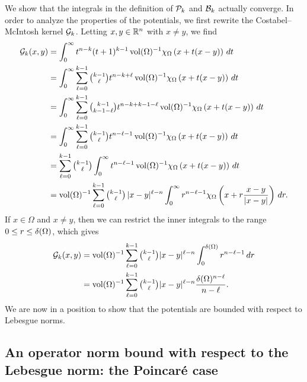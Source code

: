 \documentclass[10pt,a4paper]{article}
\begin{document}
We show that the integrals in the definition of ${\mathcal P}_{k}$ and ${\mathcal B}_{k}$ actually converge. 
In order to analyze the properties of the potentials,
we first rewrite the Costabel--McIntosh kernel ${\mathcal G}_{k}$.
Letting $x,y \in {\mathbb R}^n$ with $x \neq y$, we find 
\begin{align*}
    {\mathcal G}_{k}(x,y) 
    &= 
    \int_{0}^{\infty} t^{n-k} (t+1)^{k-1} \operatorname{vol}(\Omega)^{-1} \chi_{\Omega} \left( x+t(x-y) \right)\,dt
    \\
    &= 
    \int_{0}^{\infty} \sum_{\ell=0}^{k-1} \tbinom{k-1}{\ell} t^{n-k+\ell} \operatorname{vol}(\Omega)^{-1} \chi_{\Omega} \left( x+t(x-y) \right)\,dt
    \\
    &= 
    \int_{0}^{\infty} \sum_{\ell=0}^{k-1} \tbinom{k-1}{k-1-\ell} t^{n-k+k-1-\ell} \operatorname{vol}(\Omega)^{-1} \chi_{\Omega} \left( x+t(x-y) \right)\,dt
    \\
    &= 
    \int_{0}^{\infty} \sum_{\ell=0}^{k-1} \tbinom{k-1}{\ell} t^{n-\ell-1} \operatorname{vol}(\Omega)^{-1} \chi_{\Omega} \left( x+t(x-y) \right)\,dt
    \\
    &= 
    \sum_{\ell=0}^{k-1} \tbinom{k-1}{\ell} \int_{0}^{\infty} t^{n-\ell-1} \operatorname{vol}(\Omega)^{-1} \chi_{\Omega}\left( x+t(x-y) \right)\,dt 
    \\
    &= 
    \operatorname{vol}(\Omega)^{-1} \sum_{\ell=0}^{k-1} \tbinom{k-1}{\ell} \, |x-y|^{\ell-n} \int_{0}^{\infty} r^{n-\ell-1} \chi_{\Omega}\left(x+r\frac{x-y}{|x-y|}\right)\,dr
    .
\end{align*}
If $x \in \Omega$ and $x \neq y$, 
then we can restrict the inner integrals to the range $0 \leq r \leq {\delta}(\Omega)$, which gives 
\begin{align*}
    {\mathcal G}_{k}(x,y) 
    &= 
    \operatorname{vol}(\Omega)^{-1} \sum_{\ell=0}^{k-1}\tbinom{k-1}{\ell} |x-y|^{\ell-n} \int_{0}^{{\delta}(\Omega)} r^{n-\ell-1} \,dr 
    \\
    &= 
    \operatorname{vol}(\Omega)^{-1} \sum_{\ell=0}^{k-1}\tbinom{k-1}{\ell} |x-y|^{\ell-n} \frac{ {\delta}(\Omega)^{n-\ell} }{n-\ell}.
\end{align*}
We are now in a position to show that the potentials are bounded with respect to Lebesgue norms. 



\subsection{An operator norm bound with respect to the Lebesgue norm: the Poincar\'e case}
\end{document}
